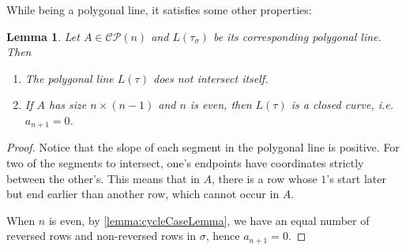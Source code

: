 \documentclass[pdflatex,sn-mathphys-num]{sn-jnl}%
\theoremstyle{thmstyleone}%
\newtheorem{lemma}[theorem]{Lemma}
\theoremstyle{thmstyletwo}%
\theoremstyle{thmstylethree}%
\numberwithin{equation}{section}
\DeclareMathOperator{\Pet}{Pet}
\begin{document}
        While being a polygonal line, it satisfies some other properties:
        \begin{lemma}
            Let $A\in \mathcal{CP}(n)$ and $L(\tau_{\sigma})$ be its corresponding polygonal line. Then
            \begin{enumerate}
            \item The polygonal line $L(\tau)$ does not intersect itself.
            \item If $A$ has size $n\times (n-1)$ and $n$ is even, then $L(\tau)$ is a closed curve, i.e. $a_{n+1}=0$.
            \end{enumerate}
        \end{lemma}
        \begin{proof}
           Notice that the slope of each segment in the polygonal line is positive. For two of the segments to intersect, one's endpoints have coordinates strictly between the other's. This means that in $A$, there is a row whose $1$'s start later but end earlier than another row, which cannot occur in $A$.
        
           When $n$ is even, by \cref{lemma:cycleCaseLemma}, we have an equal number of reversed rows and non-reversed rows in $\sigma$, hence $a_{n+1}=0$.

           

\end{proof}
\end{document}
